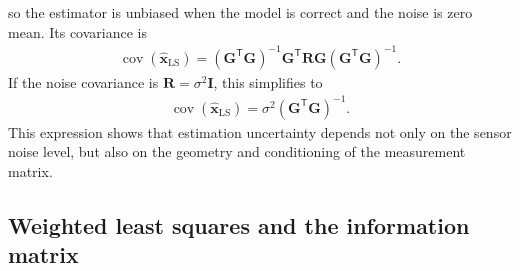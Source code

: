 so the estimator is unbiased when the model is correct and the noise is zero mean. Its covariance is
\begin{align}
\operatorname{cov} \left( \widehat{\mathbf{x}}_{\mathrm{LS}} \right) =
\left(
\mathbf{G}^{\mathsf T}
\mathbf{G}
\right)^{-1}
\mathbf{G}^{\mathsf T}
\mathbf{R}
\mathbf{G}
\left(
\mathbf{G}^{\mathsf T}
\mathbf{G}
\right)^{-1}.
\end{align}
If the noise covariance is $\mathbf{R}=\sigma^2\mathbf{I}$, this simplifies to
\begin{align}
\operatorname{cov} \left(\widehat{\mathbf{x}}_{\mathrm{LS}} \right) = \sigma^2\left( \mathbf{G}^{\mathsf T} \mathbf{G} \right)^{-1}.
\end{align}
This expression shows that estimation uncertainty depends not only on the sensor noise level, but also on the geometry and conditioning of the measurement matrix.

\subsection{Weighted least squares and the information matrix}

